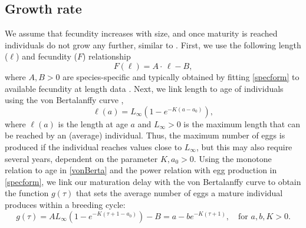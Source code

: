 \documentclass{article}
\numberwithin{theorem}{section}
\begin{document}
{%





\subsection{Growth rate}
We   assume that fecundity increases with size, and once maturity is reached individuals do not grow any further, similar to \cite{stearnsEvolutionPhenotypicPlasticity1986}. 
First, we use the following length ($\ell$) and fecundity ($F$) relationship 
\begin{equation}\label{specform}
F(\ell)=A\cdot \, \ell - B,
\end{equation}
where $A, B>0$ are species-specific and typically obtained by fitting \eqref{specform} to available fecundity at length data \cite{Niu,biology12010131}.
Next, we link length to age of individuals using the von Bertalanffy curve \cite{vonB, LatA},
\begin{equation}\label{vonBerta}
\ell (a)=L_{\infty}\left(1-e^{-K(a-a_0)}\right),
\end{equation}
where $\ell(a)$ is the length at age $a$ and $L_\infty>0$ is the maximum length that can be reached by an (average) individual. Thus, the maximum number of eggs is produced if the individual reaches values close to $L_\infty$, but this may also require several years, dependent on the parameter $K, a_0>0$. %
Using the monotone relation to age in \eqref{vonBerta} and the power relation with egg production in \eqref{specform}, we link our maturation delay with the von Bertalanffy curve to obtain the function $g(\tau)$ that sets the average number of eggs a mature individual produces within a breeding cycle:
\begin{equation}\label{eq:growth}
g(\tau)=A L_\infty (1 -  e^{-K(\tau+1-a_0)})-B
=a - b e^{-K(\tau+1)}, \quad \mbox{for}\,\, a,b, K>0.
\end{equation}

}
\end{document}
